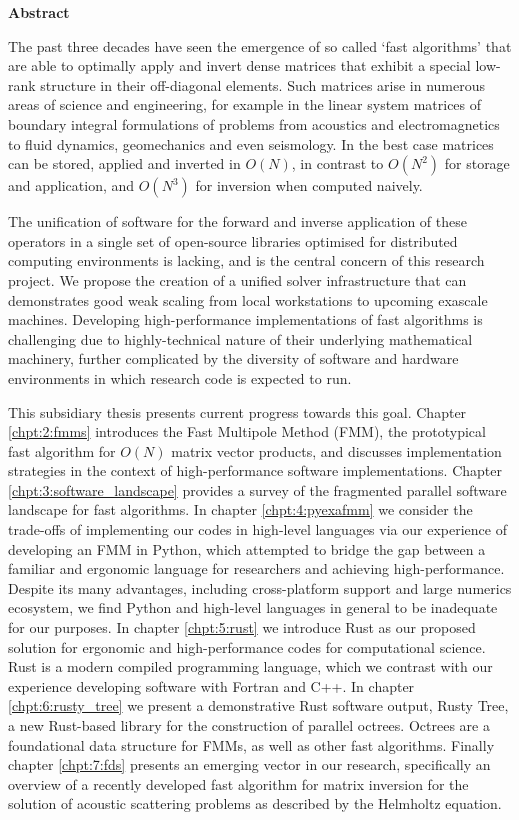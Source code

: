 \thispagestyle{plain}

\begin{center}
    \textbf{Abstract}
\end{center}

The past three decades have seen the emergence of so called `fast algorithms' that are able to optimally apply and invert dense matrices that exhibit a special low-rank structure in their off-diagonal elements. Such matrices arise in numerous areas of science and engineering, for example in the linear system matrices of boundary integral formulations of problems from acoustics and electromagnetics to fluid dynamics, geomechanics and even seismology. In the best case matrices can be stored, applied and inverted in $O(N)$, in contrast to $O(N^2)$ for storage and application, and $O(N^3)$ for inversion when computed naively.

The unification of software for the forward and inverse application of these operators in a single set of open-source libraries optimised for distributed computing environments is lacking, and is the central concern of this research project. We propose the creation of a unified solver infrastructure that can demonstrates good weak scaling from local workstations to upcoming exascale machines. Developing high-performance implementations of fast algorithms is challenging due to highly-technical nature of their underlying mathematical machinery, further complicated by the diversity of software and hardware environments in which research code is expected to run.

This subsidiary thesis presents current progress towards this goal. Chapter \ref{chpt:2:fmms} introduces the Fast Multipole Method (FMM), the prototypical fast algorithm for $O(N)$ matrix vector products, and discusses implementation strategies in the context of high-performance software implementations. Chapter \ref{chpt:3:software_landscape} provides a survey of the fragmented parallel software landscape for fast algorithms. In chapter \ref{chpt:4:pyexafmm} we consider the trade-offs of implementing our codes in high-level languages via our experience of developing an FMM in Python, which attempted to bridge the gap between a familiar and ergonomic language for researchers and achieving high-performance. Despite its many advantages, including cross-platform support and large numerics ecosystem, we find Python and high-level languages in general to be inadequate for our purposes. In chapter \ref{chpt:5:rust} we introduce Rust as our proposed solution for ergonomic and high-performance codes for computational science. Rust is a modern compiled programming language, which we contrast with our experience developing software with Fortran and C++. In chapter \ref{chpt:6:rusty_tree} we present a demonstrative Rust software output, Rusty Tree, a new Rust-based library for the construction of parallel octrees. Octrees are a foundational data structure for FMMs, as well as other fast algorithms. Finally chapter \ref{chpt:7:fds} presents an emerging vector in our research, specifically an overview of a recently developed fast algorithm for matrix inversion for the solution of acoustic scattering problems as described by the Helmholtz equation.

